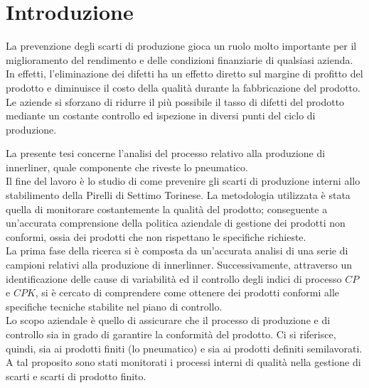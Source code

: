 \chapter*{Introduzione}


La prevenzione degli scarti di produzione gioca un ruolo molto importante per il miglioramento del rendimento e delle condizioni finanziarie di qualsiasi azienda. \\
In effetti, l'eliminazione dei difetti ha un effetto diretto sul margine di profitto del prodotto e diminuisce il costo della qualità durante la fabbricazione del prodotto. 
Le aziende si sforzano di ridurre il più possibile il tasso di difetti del prodotto mediante un costante controllo ed ispezione in diversi punti del ciclo di produzione. 
\cite{herdt2010maternal} 


La presente tesi concerne l’analisi del processo relativo alla produzione di innerliner, quale componente che riveste lo pneumatico. \\
Il fine del lavoro è lo studio di come prevenire gli scarti di produzione interni allo stabilimento della Pirelli di Settimo Torinese.
La metodologia utilizzata è stata quella di monitorare costantemente la qualità del prodotto; conseguente a un'accurata comprensione della politica aziendale di gestione dei prodotti non conformi, ossia dei prodotti che non rispettano le specifiche richieste. \\
La prima fase della ricerca si è composta da un'accurata analisi di una serie di campioni relativi alla produzione di innerlinner.
Successivamente, attraverso un identificazione delle cause di variabilità ed il controllo degli indici di processo $CP$ e $CPK$, si è cercato di comprendere come ottenere dei prodotti conformi alle specifiche tecniche stabilite nel piano di controllo. \\
Lo scopo aziendale è quello di assicurare che il processo di produzione e di controllo sia in grado di garantire la conformità del prodotto. 
Ci si riferisce, quindi, sia ai prodotti finiti (lo pneumatico) e sia ai prodotti definiti semilavorati.
A tal proposito sono stati monitorati i processi interni di qualità nella gestione di scarti e scarti di prodotto finito. 
 

